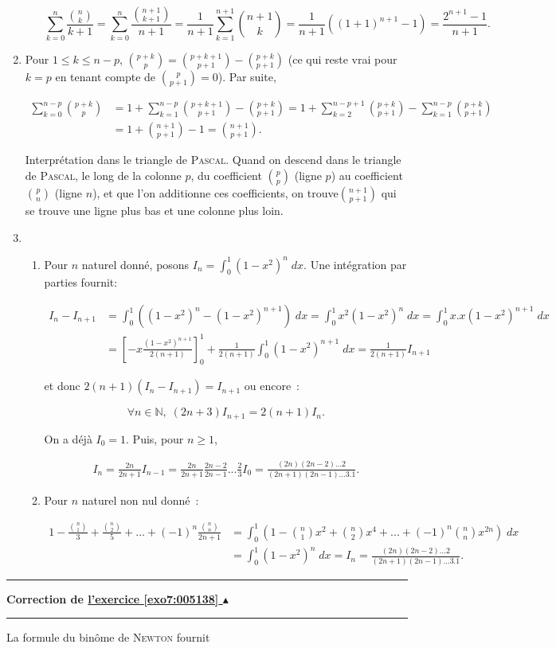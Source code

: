 \documentclass[11pt,a4paper]{article}
\newcommand{\Nn}{\mathbb{N}} \newcommand{\N}{\mathbb{N}}
\newcounter{exo}
\newcommand{\correction}[1]{\hypertarget{cor7:#1}{}\label{cor7:#1}{\bf Correction de \hyperlink{exo7:#1}{l'exercice \ref{exo7:#1} $\blacktriangle$}}\vspace{1mm}\hrule\vspace{1mm}}
\newcommand{\fincorrection}{\vspace{1mm}\hrule\vspace*{7mm}}
\begin{document}
\begin{enumerate}
\begin{itemize}
$$\sum_{k=0}^{n}\frac{\binom{n}{k}}{k+1}=\sum_{k=0}^{n}\frac{\binom{n+1}{k+1}}{n+1}=\frac{1}{n+1}\sum_{k=1}^{n+1}\binom{n+1}{k}
=\frac{1}{n+1}((1+1)^{n+1}-1)=\frac{2^{n+1}-1}{n+1}.$$
\end{itemize}

\item  Pour $1\leq k\leq n-p$, $\binom{p+k}{p}=\binom{p+k+1}{p+1}-\binom{p+k}{p+1}$ (ce qui reste vrai pour $k=p$ en tenant
compte de $\binom{p}{p+1}=0$). Par suite,

\begin{align*}
\sum_{k=0}^{n-p}\binom{p+k}{p}&=1+\sum_{k=1}^{n-p}\binom{p+k+1}{p+1}-\binom{p+k}{p+1}=1+\sum_{k=2}^{n-p+1}\binom{p+k}{p+1}
-\sum_{k=1}^{n-p}\binom{p+k}{p+1}\\
 &=1+\binom{n+1}{p+1}-1=\binom{n+1}{p+1}.
\end{align*}

Interprétation dans le triangle de \textsc{Pascal}. Quand on descend dans le triangle de \textsc{Pascal}, le long de la
colonne $p$, du coefficient $\binom{p}{p}$ (ligne $p$) au coefficient $\binom{p}{n}$ (ligne $n$), et que l'on additionne ces
coefficients, on trouve$\binom{n+1}{p+1}$ qui se trouve une ligne plus bas et une colonne plus loin.

\item 
\begin{enumerate}
\item Pour $n$ naturel donné, posons $I_n=\int_{0}^{1}(1-x^2)^n\;dx$. Une intégration par parties fournit:

\begin{align*}
I_n-I_{n+1}&=\int_{0}^{1}((1-x^2)^n-(1-x^2)^{n+1})\;dx=\int_{0}^{1}x^2(1-x^2)^n\;dx=\int_{0}^{1}x.x(1-x^2)^{n+1}\;dx\\
 &=\left[-x\frac{(1-x^2)^{n+1}}{2(n+1)}\right]_{0}^{1}+\frac{1}{2(n+1)}\int_{0}^{1}(1-x^2)^{n+1}\;dx
=\frac{1}{2(n+1)}I_{n+1}
\end{align*}

et donc $2(n+1)(I_n-I_{n+1})=I_{n+1}$ ou encore~:

$$\forall n\in\Nn,\;(2n+3)I_{n+1}=2(n+1)I_n.$$

On a déjà $I_0=1$. Puis, pour $n\geq1$,

\begin{align*}
I_n=\frac{2n}{2n+1}I_{n-1}=\frac{2n}{2n+1}\frac{2n-2}{2n-1}...\frac{2}{3}I_0=\frac{(2n)(2n-2)...2}{(2n+1)(2n-1)...3
.1}.
\end{align*}

\item Pour $n$
naturel non nul donné~:

\begin{align*}
1-\frac{\binom{n}{1}}{3}+\frac{\binom{n}{2}}{5}+...+(-1)^n\frac{\binom{n}{n}}{2n+1}&=\int_{0}^{1}(1-\binom{n}{1}x^2+\binom{n}{2}x^4+...
+(-1)^n\binom{n}{n}x^{2n})\;dx\\
 &=\int_{0}^{1}(1-x^2)^n\;dx=I_n
=\frac{(2n)(2n-2)...2}{(2n+1)(2n-1)...3.1}.
\end{align*}

\end{enumerate}
\end{enumerate}
\fincorrection
\correction{005138}
La formule du binôme de \textsc{Newton} fournit
\end{document}
